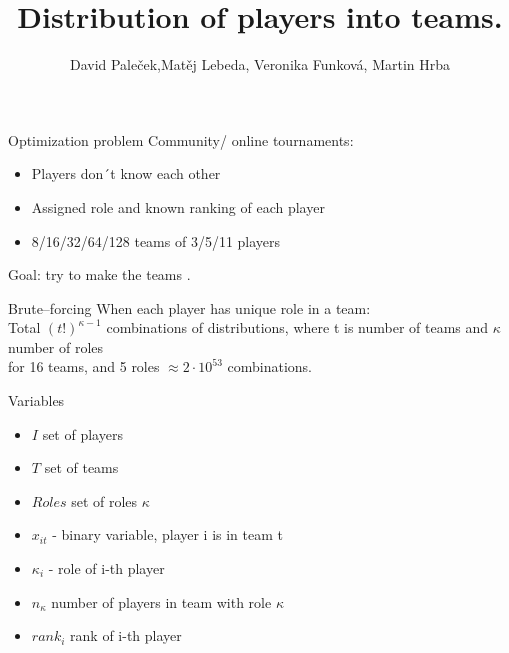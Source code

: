 \documentclass[11pt]{beamer}
\author{David Paleček,Matěj Lebeda, Veronika Funková, Martin Hrba}
\title{Distribution of players into teams.}
\begin{document}
\begin{frame}
\titlepage
\end{frame}


\begin{frame}{Optimization problem}
Community/ online tournaments:
\begin{itemize}
\item Players don´t know each other
\item Assigned role and known ranking of each player
\item 8/16/32/64/128 teams of 3/5/11 players
\end{itemize}
\vspace{1cm}
Goal: try to make the teams .
\end{frame}

\begin{frame}{Brute--forcing}
When each player has unique role in a team:\\\vspace{0.5 cm}
Total $(t!)^{\kappa-1}$ combinations of distributions, where t is number of teams and $\kappa$ number of roles\\\vspace{0.5cm}
for 16 teams, and 5 roles $\approx 2\cdot 10^{53}$ combinations.\\
\end{frame}
 
\begin{frame}{Variables}
\begin{itemize}
\item $I$ set of players\\
\item $T$ set of teams\\
\item $Roles$ set of roles $\kappa$
\item $x_{it}$ - binary variable, player i is in team t
\item $\kappa_i$ - role of i-th player
\item $n_{\kappa}$ number of players in team with role $\kappa$
\item $rank_i$ rank of i-th player
\end{itemize}
\end{frame}
\end{document}
